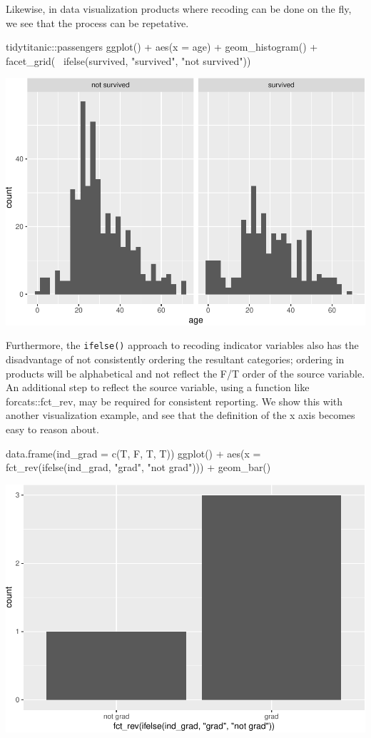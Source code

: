 Likewise, in data visualization products where recoding can be done on
the fly, we see that the process can be repetative.

\begin{Schunk}
\begin{Sinput}
tidytitanic::passengers %
ggplot() + 
  aes(x = age) + 
  geom_histogram() + 
  facet_grid(~ ifelse(survived, 
                      "survived", 
                      "not survived")) 
\end{Sinput}

\includegraphics[width=0.69\linewidth]{r_journal_files/figure-latex/visual_status_quo-1} \end{Schunk}

Furthermore, the \texttt{ifelse()} approach to recoding indicator
variables also has the disadvantage of not consistently ordering the
resultant categories; ordering in products will be alphabetical and not
reflect the F/T order of the source variable. An additional step to
reflect the source variable, using a function like forcats::fct\_rev,
may be required for consistent reporting. We show this with another
visualization example, and see that the definition of the x axis becomes
easy to reason about.

\begin{Schunk}
\begin{Sinput}
data.frame(ind_grad = c(T, F, T, T)) %
  ggplot() + 
  aes(x = fct_rev(ifelse(ind_grad, "grad", "not grad"))) +
  geom_bar()
\end{Sinput}

\includegraphics[width=0.69\linewidth]{r_journal_files/figure-latex/visual_status_quo_order-1} \end{Schunk}

